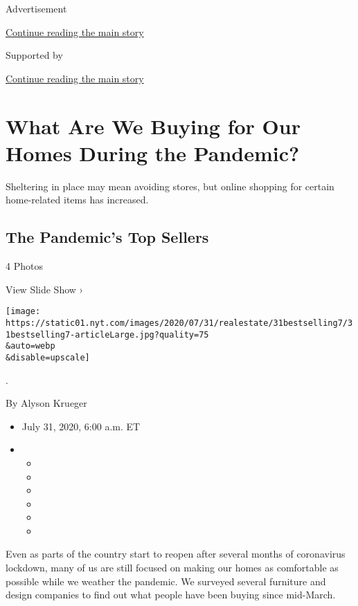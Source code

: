 Advertisement

\protect\hyperlink{after-top}{Continue reading the main story}

Supported by

\protect\hyperlink{after-sponsor}{Continue reading the main story}

\hypertarget{what-are-we-buying-for-our-homes-during-the-pandemic}{%
\section{What Are We Buying for Our Homes During the
Pandemic?}\label{what-are-we-buying-for-our-homes-during-the-pandemic}}

Sheltering in place may mean avoiding stores, but online shopping for
certain home-related items has increased.

\href{https://www.nytimes.com/slideshow/2020/07/31/realestate/the-pandemics-top-sellers.html}{}

\hypertarget{the-pandemics-top-sellers}{%
\subsection{The Pandemic's Top
Sellers}\label{the-pandemics-top-sellers}}

4 Photos

View Slide Show ›

\texttt{[image: https://static01.nyt.com/images/2020/07/31/realestate/31bestselling7/31bestselling7-articleLarge.jpg?quality=75\\\&auto=webp\\\&disable=upscale]}

.

By Alyson Krueger

\begin{itemize}
\item
  July 31, 2020, 6:00 a.m. ET
\item
  \begin{itemize}
  \item
  \item
  \item
  \item
  \item
  \item
  \end{itemize}
\end{itemize}

Even as parts of the country start to reopen after several months of
coronavirus lockdown, many of us are still focused on making our homes
as comfortable as possible while we weather the pandemic. We surveyed
several furniture and design companies to find out what people have been
buying since mid-March.

